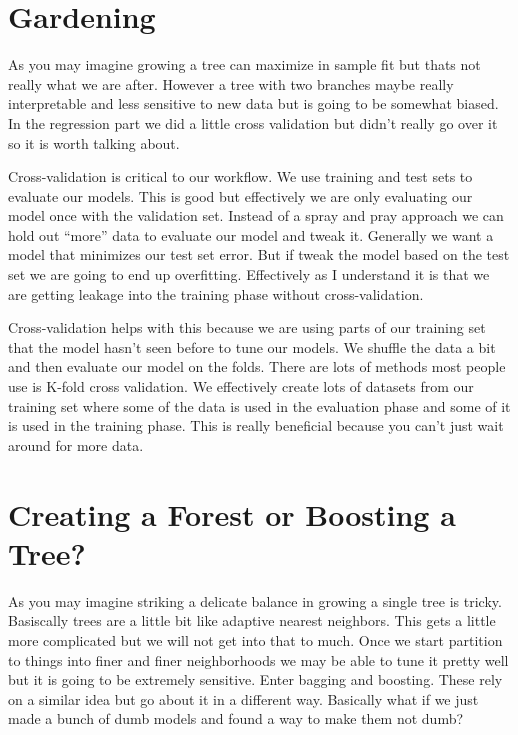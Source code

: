 \documentclass[
  letterpaper,
  DIV=11,
  numbers=noendperiod]{scrreprt}
\begin{document}
\section{Gardening}\label{gardening}

As you may imagine growing a tree can maximize in sample fit but thats
not really what we are after. However a tree with two branches maybe
really interpretable and less sensitive to new data but is going to be
somewhat biased. In the regression part we did a little cross validation
but didn't really go over it so it is worth talking about.

Cross-validation is critical to our workflow. We use training and test
sets to evaluate our models. This is good but effectively we are only
evaluating our model once with the validation set. Instead of a spray
and pray approach we can hold out ``more'' data to evaluate our model
and tweak it. Generally we want a model that minimizes our test set
error. But if tweak the model based on the test set we are going to end
up overfitting. Effectively as I understand it is that we are getting
leakage into the training phase without cross-validation.

Cross-validation helps with this because we are using parts of our
training set that the model hasn't seen before to tune our models. We
shuffle the data a bit and then evaluate our model on the folds. There
are lots of methods most people use is K-fold cross validation. We
effectively create lots of datasets from our training set where some of
the data is used in the evaluation phase and some of it is used in the
training phase. This is really beneficial because you can't just wait
around for more data.

\section{Creating a Forest or Boosting a
Tree?}\label{creating-a-forest-or-boosting-a-tree}

As you may imagine striking a delicate balance in growing a single tree
is tricky. Basiscally trees are a little bit like adaptive nearest
neighbors. This gets a little more complicated but we will not get into
that to much. Once we start partition to things into finer and finer
neighborhoods we may be able to tune it pretty well but it is going to
be extremely sensitive. Enter bagging and boosting. These rely on a
similar idea but go about it in a different way. Basically what if we
just made a bunch of dumb models and found a way to make them not dumb?
\end{document}
